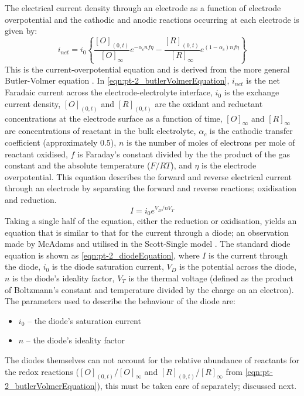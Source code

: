     The electrical current density through an electrode as a function of electrode overpotential and the cathodic and anodic reactions occurring at each electrode is given by:
    \begin{equation}
      i_{net} = i_{0} \left\{ \frac{[O]_{(0,t)}}{[O]_{\infty}}e^{-\alpha_{c}nf\eta} - \frac{[R]_{(0,t)}}{[R]_{\infty}}e^{(1-\alpha_{c})nf\eta}\right\}
      \label{eqn:pt-2_butlerVolmerEquation}
    \end{equation}
    This is the current-overpotential equation and is derived from the more general Butler-Volmer equation \cite{Merrill2005,ScottSingle2013}.
    In \cref{eqn:pt-2_butlerVolmerEquation}, $i_{net}$ is the net Faradaic current across the electrode-electrolyte interface,
    $i_{0}$ is the exchange current density,
    $[O]_{(0,t)}$ and $[R]_{(0,t)}$ are the oxidant and reductant concentrations at the electrode surface as a function of time,
    $[O]_{\infty}$ and $[R]_{\infty}$ are concentrations of reactant in the bulk electrolyte,
    $\alpha_{c}$ is the cathodic transfer coefficient (approximately 0.5),
    $n$ is the number of moles of electrons per mole of reactant oxidised,
    $f$ is Faraday's constant divided by the the product of the gas constant and the absolute temperature ($F/RT$),
    and $\eta$ is the electrode overpotential.
    This equation describes the forward and reverse electrical current through an electrode by separating the forward and reverse reactions; oxidisation and reduction.
    \begin{equation}
      I = i_0 e^{V_D / n V_T}
      \label{eqn:pt-2_diodeEquation}
    \end{equation}
    Taking a single half of the equation, either the reduction or oxidisation, yields an equation that is similar to that for the current through a diode; an observation made by McAdams and utilised in the Scott-Single model \cite{McAdams1995}.
    The standard diode equation is shown as \cref{eqn:pt-2_diodeEquation}, where
    $I$ is the current through the diode,
    $i_0$ is the diode saturation current,
    $V_D$ is the potential across the diode,
    $n$ is the diode's ideality factor,
    $V_T$ is the thermal voltage (defined as the product of Boltzmann's constant and temperature divided by the charge on an electron).
    The parameters used to describe the behaviour of the diode are:
    \begin{itemize}
      \item $i_0$ -- the diode's saturation current
      \item $n$ -- the diode's ideality factor
    \end{itemize}
    The diodes themselves can not account for the relative abundance of reactants for the redox reactions ($[O]_{(0,t)}/[O]_{\infty}$ and $[R]_{(0,t)}/[R]_{\infty}$ from \cref{eqn:pt-2_butlerVolmerEquation}), this must be taken care of separately; discussed next.


